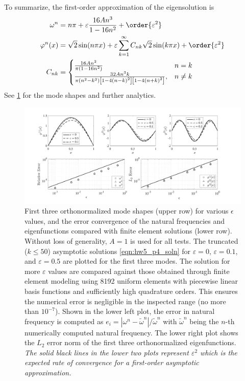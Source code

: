 \begin{enumerate}[(i)]
{    To summarize, the first-order approximation of the eigensolution is 
    \begin{equation}\label{eqn:hw5_p4_soln}
    \begin{aligned}
        \omega^n &= n\pi + \varepsilon \frac{16 A n^3}{1 - 16n^2} + \order{\varepsilon^2} \\
        \varphi^n(x) &= \sqrt{2} \sin(n\pi x) + \varepsilon \sum_{k=1}^\infty C_{nk} \sqrt{2} \sin(k\pi x)  + \order{\varepsilon^2} \\
        C_{nk} &= \begin{cases}
            \frac{16 A n^2}{\pi(1 - 16n^2)} & n = k \\
            \frac{32 A n^3 k}{\pi(n^2 - k^2)\left[1 - 4{(n-k)}^2\right] \left[1 - 4{(n+k)}^2\right]}, & n \neq k
        \end{cases}
    \end{aligned}
    \end{equation}
    See \cref{fig:hw5_p4_conv} for the mode shapes and further analytics.
}
\begin{figure}[!ht]
    \centering
    \includegraphics[width=\textwidth]{homework/hw5/assets/hw5_p4_conv.pdf}
    \caption{
        First three orthonormalized mode shapes (upper row) for various $\epsilon$ values, and the error convergence of the natural frequencies and eigenfunctions compared with finite element solutions (lower row). 
        Without loss of generality, $A = 1$ is used for all tests. 
        The truncated ($k \leq 50$) asymptotic solutions \cref{eqn:hw5_p4_soln} for $\varepsilon = 0$, $\varepsilon = 0.1$, and $\varepsilon = 0.5$ are plotted for the first three modes. 
        The solution for more $\varepsilon$ values are compared against those obtained through finite element modeling using 8192 uniform elements with piecewise linear basis functions and sufficiently high quadrature orders. 
        This ensures the numerical error is negligible in the inspected range (no more than $10^{-7}$). 
        Shown in the lower left plot, the error in natural frequency is computed as $e_i = |\omega^n - \tilde{\omega}^n| / \tilde{\omega}^n$ with $\tilde{\omega}^n$ being the $n$-th numerically computed natural frequency. 
        The lower right plot shows the $L_2$ error norm of the first three orthonormalized eigenfunctions. 
        \emph{The solid black lines in the lower two plots represent $\varepsilon^2$ which is the expected rate of convergence for a first-order asymptotic approximation.} 
    }\label{fig:hw5_p4_conv}
\end{figure}

\end{enumerate}


